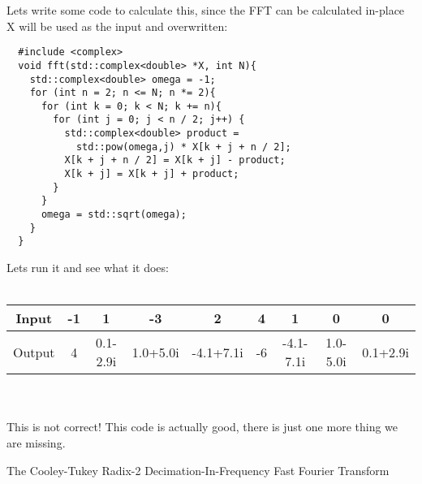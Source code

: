 \documentclass{beamer}
\begin{document}
\begin{frame}[fragile]
  Lets write some code to calculate this, since the FFT can be calculated in-place X will be used as the input and overwritten:
  \begin{lstlisting}
  #include <complex>
  void fft(std::complex<double> *X, int N){
    std::complex<double> omega = -1;
    for (int n = 2; n <= N; n *= 2){
      for (int k = 0; k < N; k += n){
        for (int j = 0; j < n / 2; j++) {
          std::complex<double> product = 
            std::pow(omega,j) * X[k + j + n / 2];
          X[k + j + n / 2] = X[k + j] - product;
          X[k + j] = X[k + j] + product;
        }
      }
      omega = std::sqrt(omega);
    }
  }
\end{lstlisting}
\end{frame}

\begin{frame}
  Lets run it and see what it does:\\~\\
  \begin{adjustbox}{width=\textwidth}
    \begin{tabular}{ |c|c|c|c|c|c|c|c|c| }
      \hline
      Input  & -1 & 1        & -3       & 2         & 4  & 1         & 0        & 0        \\
      \hline
      Output & 4  & 0.1-2.9i & 1.0+5.0i & -4.1+7.1i & -6 & -4.1-7.1i & 1.0-5.0i & 0.1+2.9i \\
      \hline
    \end{tabular}
  \end{adjustbox}\\~\\
  This is not correct! This code is actually good, there is just one more thing we are missing.

\end{frame}

\begin{frame}{The Cooley-Tukey Radix-2 Decimation-In-Frequency Fast Fourier Transform}
  \begin{adjustbox}{width=\textwidth}
  \end{adjustbox}
\end{frame}
\end{document}

